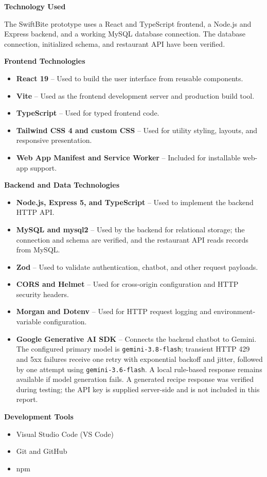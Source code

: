 \begin{center}

\Large{\textbf{Technology Used}}

\vspace{5mm}

\end{center}

\justifying

The SwiftBite prototype uses a React and TypeScript frontend, a Node.js and Express backend, and a working MySQL database connection. The database connection, initialized schema, and restaurant API have been verified.

\vspace{3mm}

\textbf{Frontend Technologies}
\begin{itemize}
    \item \textbf{React 19} -- Used to build the user interface from reusable components.
    \item \textbf{Vite} -- Used as the frontend development server and production build tool.
    \item \textbf{TypeScript} -- Used for typed frontend code.
    \item \textbf{Tailwind CSS 4 and custom CSS} -- Used for utility styling, layouts, and responsive presentation.
    \item \textbf{Web App Manifest and Service Worker} -- Included for installable web-app support.
\end{itemize}

\vspace{3mm}

\textbf{Backend and Data Technologies}
\begin{itemize}
    \item \textbf{Node.js, Express 5, and TypeScript} -- Used to implement the backend HTTP API.
    \item \textbf{MySQL and mysql2} -- Used by the backend for relational storage; the connection and schema are verified, and the restaurant API reads records from MySQL.
    \item \textbf{Zod} -- Used to validate authentication, chatbot, and other request payloads.
    \item \textbf{CORS and Helmet} -- Used for cross-origin configuration and HTTP security headers.
    \item \textbf{Morgan and Dotenv} -- Used for HTTP request logging and environment-variable configuration.
    \item \textbf{Google Generative AI SDK} -- Connects the backend chatbot to Gemini. The configured primary model is \texttt{gemini-3.8-flash}; transient HTTP 429 and 5xx failures receive one retry with exponential backoff and jitter, followed by one attempt using \texttt{gemini-3.6-flash}. A local rule-based response remains available if model generation fails. A generated recipe response was verified during testing; the API key is supplied server-side and is not included in this report.
\end{itemize}

\vspace{3mm}

\textbf{Development Tools}
\begin{itemize}
    \item Visual Studio Code (VS Code)
    \item Git and GitHub
    \item npm
\end{itemize}

